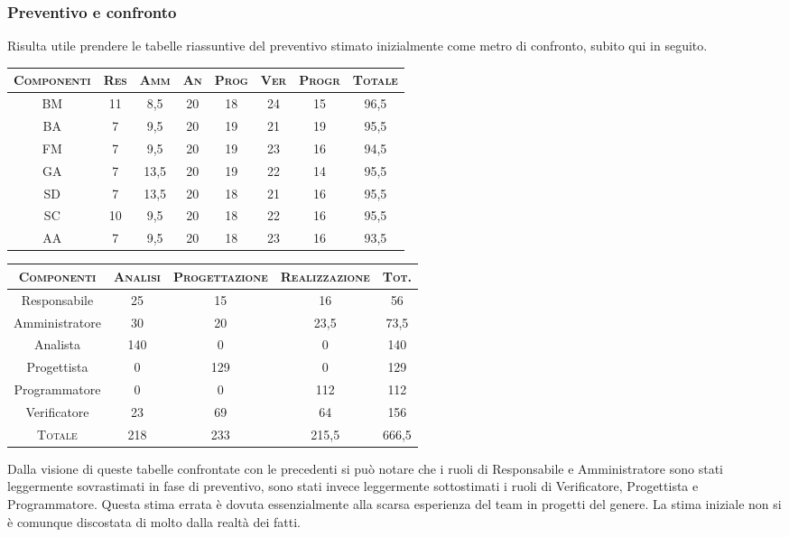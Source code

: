 \documentclass[11pt,a4paper]{article}
\begin{document}
\subsubsection{Preventivo e confronto}
Risulta utile prendere le tabelle riassuntive del preventivo stimato inizialmente come metro di confronto, subito qui in seguito.
\\
\begin{center}
\begin{tabular}{|c||c|c|c|c|c|c||c|}
\hline
\textsc{Componenti} & \textsc{Res} & \textsc{Amm} & \textsc{An} & \textsc{Prog} & \textsc{Ver} & \textsc{Progr} & \textsc{Totale}\\
\hline \hline
BM & 11 & 8,5 & 20 & 18 & 24 & 15 & 96,5 \\ \hline
BA & 7 & 9,5 & 20 & 19 & 21 & 19 & 95,5 \\ \hline
FM & 7 & 9,5 & 20 & 19 & 23 & 16 & 94,5 \\ \hline
GA & 7 & 13,5 & 20 & 19 & 22 & 14 & 95,5 \\ \hline
SD & 7 & 13,5 & 20 & 18 & 21 & 16 & 95,5 \\ \hline
SC & 10 & 9,5 & 20 & 18 & 22 & 16 & 95,5 \\ \hline
AA & 7 & 9,5 & 20 & 18 & 23 & 16 & 93,5 \\ \hline
\end{tabular}
\end{center}
\bigskip
\begin{center}
\begin{tabular}{|c||c|c|c||c|}
\hline
\textsc{Componenti}& \textsc{Analisi} & \textsc{Progettazione} & \textsc{Realizzazione} & \textsc{Tot.} \\ \hline \hline
Responsabile & 25 & 15 & 16 & 56 \\ \hline
Amministratore & 30 & 20 & 23,5 & 73,5 \\ \hline
Analista & 140 & 0 & 0 & 140 \\ \hline
Progettista & 0 & 129 & 0 & 129 \\ \hline
Programmatore & 0 & 0 & 112 & 112 \\ \hline
Verificatore & 23 & 69 & 64 & 156 \\ \hline \hline
\textsc{Totale} & 218 & 233 & 215,5 & 666,5 \\ \hline
\end{tabular}
\end{center}


Dalla visione di queste tabelle confrontate con le precedenti si può notare che i ruoli di Responsabile e Amministratore sono stati leggermente sovrastimati in fase di preventivo, sono stati invece leggermente sottostimati i ruoli di Verificatore, Progettista e Programmatore. Questa stima errata è dovuta essenzialmente alla scarsa esperienza del team in progetti del genere. La stima iniziale non si è comunque discostata di molto dalla realtà dei fatti.
\bigskip
\end{document}
